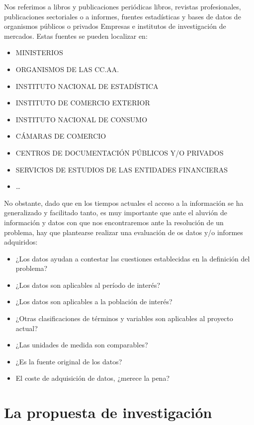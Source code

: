 \documentclass[
]{book}
\providecommand{\tightlist}{%
  \setlength{\itemsep}{0pt}\setlength{\parskip}{0pt}}
\begin{document}
Nos referimos a libros y publicaciones periódicas libros, revistas profesionales, publicaciones sectoriales o a informes, fuentes estadísticas y bases de datos de organismos públicos o privados Empresas e institutos de investigación de mercados. Estas fuentes se pueden localizar en:

\begin{itemize}
\tightlist
\item
  MINISTERIOS
\item
  ORGANISMOS DE LAS CC.AA.
\item
  INSTITUTO NACIONAL DE ESTADÍSTICA
\item
  INSTITUTO DE COMERCIO EXTERIOR
\item
  INSTITUTO NACIONAL DE CONSUMO
\item
  CÁMARAS DE COMERCIO
\item
  CENTROS DE DOCUMENTACIÓN PÚBLICOS Y/O PRIVADOS
\item
  SERVICIOS DE ESTUDIOS DE LAS ENTIDADES FINANCIERAS
\item
  \ldots{}
\end{itemize}

No obstante, dado que en los tiempos actuales el acceso a la información se ha generalizado y facilitado tanto, es muy importante que ante el aluvión de información y datos con que nos encontraremos ante la resolución de un problema, hay que plantearse realizar una evaluación de os datos y/o informes adquiridos:

\begin{itemize}
\tightlist
\item
  ¿Los datos ayudan a contestar las cuestiones establecidas en la definición del problema?
\item
  ¿Los datos son aplicables al período de interés?
\item
  ¿Los datos son aplicables a la población de interés?
\item
  ¿Otras clasificaciones de términos y variables son aplicables al proyecto actual?
\item
  ¿Las unidades de medida son comparables?
\item
  ¿Es la fuente original de los datos?
\item
  El coste de adquisición de datos, ¿merece la pena?
\end{itemize}

\hypertarget{la-propuesta-de-investigaciuxf3n}{%
\section{La propuesta de investigación}\label{la-propuesta-de-investigaciuxf3n}}
\end{document}
